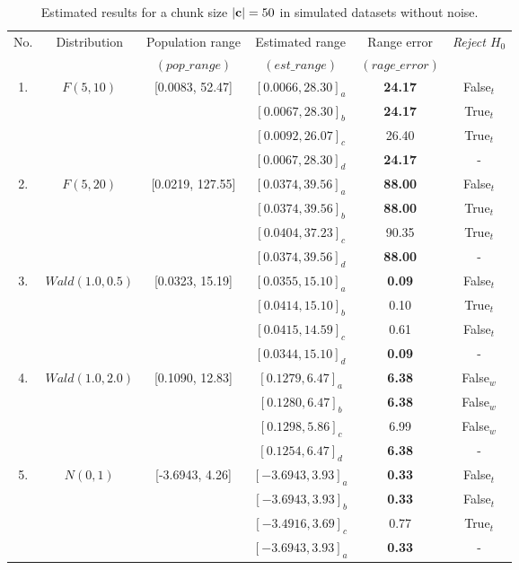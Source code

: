 \documentclass[a4paper,fleqn]{cas-dc}
\begin{document}
\begin{table}[h!]    
\centering
\caption{Estimated results for a chunk size $|{\bf c}|=50$ in simulated datasets without noise.}
\label{tab:res-siml50nonoise}
\begin{threeparttable}
\begin{tabular}{|c|c|c|c|c|c|}
\hline
\multirow{2}{*}{No.} & \multirow{2}{*}{Distribution} & Population range & 
Estimated range&Range error& \multirow{2}{*}{\it{Reject} $H_0$} \\
&&$(pop\_range)$&$(est\_range)$&$(rage\_error)$& \\
\hline
\multirow{4}{*}{1.} & \multirow{4}{*}{$F(5 ,10)$}&\multirow{4}{*}{[0.0083, 52.47]} & $[0.0066, 28.30]_{a}$& 
    \bf{24.17} &False$_t$\\
&&&$[0.0067, 28.30]_{b}$ & \bf{24.17} & True$_t$\\
&&&$[0.0092, 26.07]_c$ & 26.40  & True$_t$\\
&&&$[0.0067, 28.30]_{d}$ &  \bf{24.17} & - \\
\hline
\multirow{4}{*}{2.} & \multirow{4}{*}{$F(5 ,20)$}&\multirow{4}{*}{[0.0219, 127.55]} & $[0.0374, 39.56]_a$& 
    \bf{88.00} & False$_t$\\
    &&&$[0.0374, 39.56]_b$ & \bf{88.00} & True$_t$\\
    &&&$[0.0404, 37.23]_c$ & 90.35 & True$_t$\\
    &&&$[0.0374, 39.56]_d$ &  \bf{88.00} & - \\
\hline
\multirow{4}{*}{3.} & \multirow{4}{*}{$Wald(1.0 ,0.5)$}&\multirow{4}{*}{[0.0323, 15.19]} & 
$[0.0355, 15.10]_a$& 
    \bf{0.09} & False$_t$\\
    &&&$[0.0414, 15.10]_b$ & 0.10 & True$_t$\\
    &&&$[0.0415, 14.59]_c$ & 0.61 & False$_t$\\
    &&&$[0.0344, 15.10]_d$ & \bf{0.09} & - \\

\hline
\multirow{4}{*}{4.} & \multirow{4}{*}{$Wald(1.0 ,2.0)$}&\multirow{4}{*}{[0.1090, 12.83]} & 
$[0.1279, 6.47]_a$& 
    \bf{6.38} & False$_w$\\
    &&&$[0.1280, 6.47]_b$ & \bf{6.38} & False$_w$\\
    &&&$[0.1298, 5.86]_c$ & 6.99      &  False$_w$\\
    &&&$[0.1254, 6.47]_d$ & \bf{6.38} &  - \\    
\hline
\multirow{4}{*}{5.} & \multirow{4}{*}{$N(0 ,1)$}&\multirow{4}{*}{[-3.6943, 4.26]} & $[-3.6943, 3.93]_a$& 
    \bf{0.33} & False$_t$\\
    &&&$[-3.6943, 3.93]_b$ & \bf{0.33} & False$_t$\\
    &&&$[-3.4916, 3.69]_c$ & 0.77      & True$_t$\\
    &&&$[-3.6943, 3.93]_a$ & \bf{0.33} &  - \\    


\end{tabular}
\end{threeparttable}
\end{table}
\end{document}
